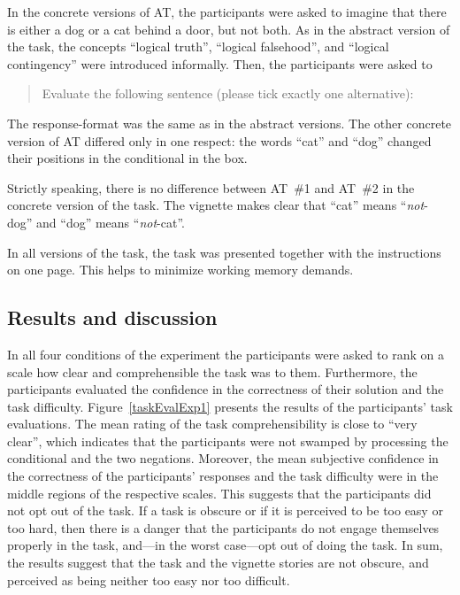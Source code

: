 \documentclass[11pt]{article}
\begin{document}
In the concrete versions of AT, the participants were asked to imagine
that there is either a dog or a cat behind a door, but not both. As in
the abstract version of the task,  the concepts
``logical truth'', ``logical falsehood'', and ``logical contingency''
were introduced informally. Then, the participants were asked to

\begin{quote}
\footnotesize
\noindent
Evaluate the following sentence (please tick exactly one alternative):


\end{quote}
\normalsize
\noindent
The response-format was the same as in the abstract versions. The
other concrete version of AT differed only in one respect: the words
``cat'' and ``dog'' changed their positions in the conditional in the
box.

Strictly speaking, there is no difference between AT~\#1 and AT~\#2 in
the concrete version of the task. The vignette makes clear that ``cat'' means
 ``\emph{not}-dog'' and  ``dog'' means ``\emph{not}-cat''.

 In all versions of the task, the task was presented together with the
 instructions on one page. This helps to minimize working memory
 demands.

\subsection{Results and discussion}
In all four conditions of the experiment the participants were asked
to rank on a scale how clear and comprehensible the task was to them.
Furthermore, the participants evaluated the confidence in the
correctness of their solution and the task
difficulty. Figure~\ref{taskEvalExp1} presents the results of the
participants' task evaluations.  The mean rating of the task
comprehensibility is close to ``very clear'', which indicates that the
participants were not swamped by processing the conditional and the
two negations. Moreover, the mean subjective confidence in the
correctness of the participants' responses and the task difficulty
were in the middle regions of the respective scales. This suggests
that the participants did not opt out of the task. If a task is
obscure or if it is perceived to be too easy or too hard, then there
is a danger that the participants do not engage themselves properly in
the task, and---in the worst case---opt out of doing the task. In sum,
the results suggest that the task and the vignette stories are not
obscure, and perceived as being neither too easy nor too difficult.
\end{document}
